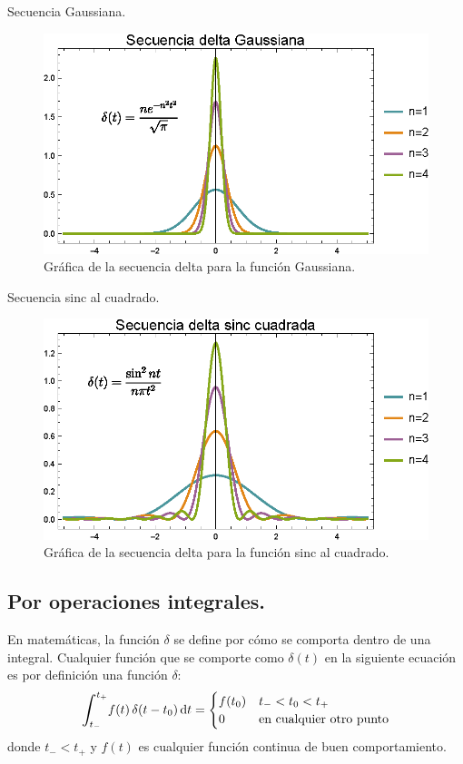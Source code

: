 \documentclass[12pt]{article}
\def\scaleint#1{\vcenter{\hbox{\scaleto[3ex]{\displaystyle\int}{#1}}}}
\def\bs{\mkern-12mu}
\numberwithin{equation}{section}
\begin{document}
Secuencia Gaussiana.
\begin{figure}[H]
    \centering
    \includegraphics[scale=1]{Imagenes/secuencia_Delta_06.eps}
    \caption{Gráfica de la secuencia delta para la función Gaussiana.}
    \label{fig:figura_05_08}
\end{figure}

\newpage

Secuencia sinc al cuadrado.
\begin{figure}[H]
    \centering
    \includegraphics[scale=1]{Imagenes/secuencia_Delta_07.eps}
    \caption{Gráfica de la secuencia delta para la función sinc al cuadrado.}
    \label{fig:figura_05_09}
\end{figure}

\subsection{Por operaciones integrales.}

En matemáticas, la función $\delta$ se define por cómo se comporta dentro de una integral. Cualquier función que se comporte como $\delta (t)$ en la siguiente ecuación es por definición una función $\delta$:
\begin{align}
\scaleint{6ex}_{\bs t_{-}}^{t_{+}} f (t) \, \delta(t - t_{0}) \dd{t} = \begin{cases}
f (t_{0}) & t_{-} < t_{0}  < t_{+} \\
0 & \mbox{en cualquier otro punto}
\end{cases}
\label{eq:ecuacion_05_14}
\end{align}
donde $t_{-} < t_{+}$ y $f (t)$ es cualquier función continua de buen comportamiento.
\end{document}
